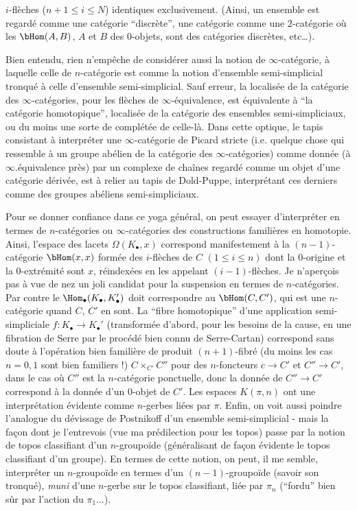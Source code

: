 $i$-flèches ($n + 1 \leq i \leq N$) identiques exclusivement. (Ainsi, un ensemble est regardé comme une catégorie ``discrète'', une catégorie comme une $2$-catégorie où les $\bHom(A, B)$, $A$ et $B$ des $0$-objets, sont des catégories discrètes, etc\dots).

Bien entendu, rien n'empêche de considérer aussi la notion de $\infty$-catégorie, à laquelle celle de $n$-catégorie est comme la notion d'ensemble semi-simplicial tronqué à celle d'ensemble semi-simplicial. Sauf erreur, la localisée de la catégorie des $\infty$-catégories, pour les flèches de $\infty$-équivalence, est équivalente à ``la catégorie homotopique'', localisée de la catégorie des ensembles semi-simpliciaux, ou du moins une sorte de complétée de celle-là. Dans cette optique, le tapis consistant à interpréter une $\infty$-catégorie de Picard stricte (i.e. quelque chose qui ressemble à un groupe abélien de la catégorie des $\infty$-catégories) comme donnée (à $\infty$.équivalence près) par un complexe de chaînes regardé comme un objet d'une catégorie dérivée, est à relier au tapis de Dold-Puppe, interprétant ces derniers comme des groupes abéliens semi-simpliciaux.

Pour se donner confiance dans ce yoga général, on peut essayer d'interpréter en termes de $n$-catégories ou $\infty$-catégories des constructions familières en homotopie. Ainsi, l'espace des lacets $\Omega (K_\bullet, x)$ correspond manifestement à la $(n-1)$-catégorie $\bHom(x, x)$ formée des $i$-flèches de $C$ $(1 \leq i \leq n)$ dont la 0-origine et la 0-extrémité sont $x$, réindexées en les appelant $(i-1)$-flèches. Je n'aper\c{c}ois pas à vue de nez un joli candidat pour la suspension en termes de $n$-catégories. Par contre le $\Hom_\bullet (K_\bullet, K_\bullet')$ doit correspondre au $\bHom(C, C')$, qui est une $n$-catégorie quand $C$, $C'$ en sont. La ``fibre homotopique'' d'une application semi-simpliciale $f: K_\bullet \to K_\bullet'$ (transformée d'abord, pour les besoins de la cause, en une fibration de Serre par le procédé bien connu de Serre-Cartan) correspond sans doute à l'opération bien familière de produit $(n+1)$-fibré (du moins les cas $n = 0, 1$ sont bien familiers !) $C \times_{C'} C''$ pour des $n$-foncteurs $c \to C'$ et $C'' \to C'$, dans le cas où $C''$ est la $n$-catégorie ponctuelle, donc la donnée de $C'' \to C'$ correspond à la donnée d'un 0-objet de $C'$. Les espaces $K(\pi, n)$ ont une interprétation évidente comme $n$-gerbes liées par $\pi$. Enfin, on voit aussi poindre l'analogue du dévissage de Postnikoff d'un ensemble semi-simplicial - mais la fa\c{c}on dont je l'entrevois (vue ma prédilection pour les topos) passe par la notion de topos classifiant d'un $n$-groupoïde (généralisant de fa\c{c}on évidente le topos classifiant d'un groupe). En termes de cette notion, on peut, il me semble, interpréter un $n$-groupoïde en termes d'un $(n-1)$-groupoïde (savoir son tronqué), \emph{muni} d'une $n$-gerbe sur le topos classifiant, liée par $\pi_n$ (``fordu'' bien sûr par l'action du $\pi_1$...).

